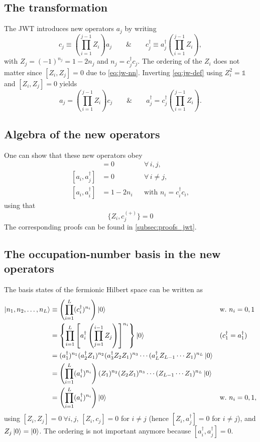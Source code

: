 \documentclass[../../main.tex]{subfiles}
\begin{document}
\subsection{The transformation}

The JWT introduces new operators $a_j$ by writing
\begin{equation}
c_j\equiv\left(\prod_{i=1}^{j-1}Z_i\right)a_j\qquad\&\qquad
c_j^\dagger\equiv a_j^\dagger\left(\prod_{i=1}^{j-1}Z_i\right), \label{eq:jw-def}
\end{equation}
with $Z_j=(-1)^{n_j}=1-2n_j$ and $n_j=c_j^\dagger c_j$. The ordering of the $Z_i$ does not
matter since $[Z_i,Z_j]=0$ due to \cref{eq:jw-nn}. Inverting \cref{eq:jw-def} using $Z_i^2=\mathds{1}$ and $[Z_i,Z_j]=0$ yields
\begin{equation}
a_j=\left(\prod_{i=1}^{j-1}Z_i\right)c_j\qquad\&\qquad
a_j^\dagger=c_j^\dagger\left(\prod_{i=1}^{j-1}Z_i\right). \label{eq:jw-inv}
\end{equation}

\subsection{Algebra of the new operators}

One can show that these new operators obey
\begin{align}
[a_i^{(+)},a_j^{(+)}]&=0 &&\forall\,i,j,\\
[a_i,a_j^\dagger]&=0 &&\forall\,i\neq j,\\
[a_i,a_i^\dagger]&=1-2n_i &&\text{with }n_i=c_i^\dagger c_i,
\end{align}
using that
\begin{equation}
\{Z_i,c_j^{(+)}\}=0 \label{eq:jw-Zc}
\end{equation}
The corresponding proofs can be found in \cref{subsec:proofs_jwt}.

\subsection{The occupation-number basis in the new operators}

The basis states of the fermionic Hilbert space can be written as
\begin{align}
\left\lvert n_1,n_2,\dots,n_L \right\rangle
&\equiv\left(\prod_{i=1}^{L}(c_i^\dagger)^{n_i}\right)\left\lvert 0 \right\rangle
&&\text{w.\ }n_i=0,1\notag\\
&=\left\{\prod_{i=1}^{L}\left[a_i^\dagger\left(\prod_{j=1}^{i-1}Z_j\right)\right]^{n_i}\right\}\left\lvert 0 \right\rangle
&&(c_1^\dagger=a_1^\dagger)\notag\\
&=(a_1^\dagger)^{n_1}(a_2^\dagger Z_1)^{n_2}(a_3^\dagger Z_2 Z_1)^{n_3}\cdots
  (a_L^\dagger Z_{L-1}\cdots Z_1)^{n_L}\left\lvert 0 \right\rangle\notag\\
&=\left(\prod_{i=1}^{L}(a_i^\dagger)^{n_i}\right)
  (Z_1)^{n_2}(Z_2 Z_1)^{n_3}\cdots(Z_{L-1}\cdots Z_1)^{n_L}\left\lvert 0 \right\rangle\notag\\
&=\left(\prod_{i=1}^{L}(a_i^\dagger)^{n_i}\right)\left\lvert 0 \right\rangle
&&\text{w.\ }n_i=0,1,
\end{align}
using $[Z_i,Z_j]=0\ \forall i,j$, $[Z_i,c_j]=0$ for $i\neq j$ (hence
$[Z_i,a_j^\dagger]=0$ for $i\neq j$), and $Z_j\left\lvert 0 \right\rangle=\left\lvert 0 \right\rangle$. The ordering is not
important anymore because $[a_i^\dagger,a_j^\dagger]=0$.
\end{document}
